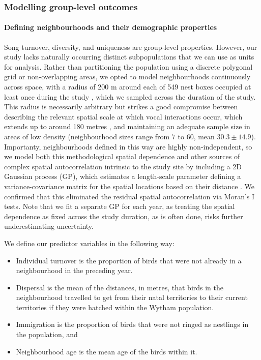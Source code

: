 \subsubsection{Modelling group-level outcomes}
\label{sc:group-properties}

\paragraph{Defining neighbourhoods and their demographic properties}

Song turnover, diversity, and uniqueness are group-level properties. However, our study lacks naturally occurring distinct subpopulations that we can use as units for analysis. Rather than partitioning the population using a discrete polygonal grid or non-overlapping areas, we opted to model neighbourhoods continuously across space, with a radius of 200 m around each of 549 nest boxes occupied at least once during the study \autocite{fayet2014}, which we sampled across the duration of the study. This radius is necessarily arbitrary but strikes a good compromise between describing the relevant spatial scale at which vocal interactions occur, which extends up to around 180 metres \autocite{bircher2021, blumenrath2004}, and maintaining an adequate sample size in areas of low density (neighbourhood sizes range from $7$ to $60$, mean $30.3\pm14.9$). Importanty, neighbourhoods defined in this way are highly non-independent, so we model both this methodological spatial dependence and other sources of complex spatial autocorrelation intrinsic to the study site by including a 2D Gaussian process (GP), which estimates a length-scale parameter defining a variance-covariance matrix for the spatial locations based on their distance \autocite{dearmon2016, gelfand2016, wright2021}. We confirmed that this eliminated the residual spatial autocorrelation via Moran's I tests. Note that we fit a separate GP for each year, as treating the spatial dependence as fixed across the study duration, as is often done, risks further underestimating uncertainty.

\noindent
We define our predictor variables in the following way: 
\begin{itemize}
    \item Individual turnover is the proportion of birds that were not already in a neighbourhood in the preceding year.
    \item Dispersal is the mean of the distances, in metres, that birds in the neighbourhood travelled to get from their natal territories to their current territories if they were hatched within the Wytham population. 
    \item Immigration is the proportion of birds that were not ringed as nestlings in the population, and 
    \item Neighbourhood age is the mean age of the birds within it. 
\end{itemize}

